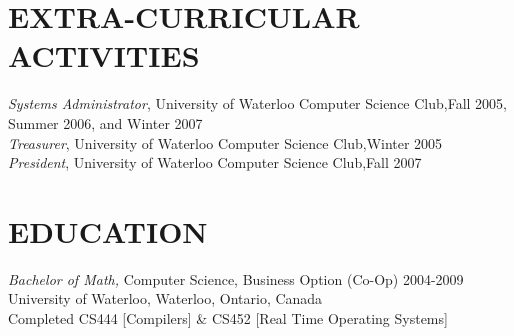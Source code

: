 \documentclass[10pt,line,margin=0.1]{newsres}
\begin{document}
\begin{resume}
 
\section{EXTRA-CURRICULAR \\ ACTIVITIES}             
        {\it Systems Administrator}, University of Waterloo Computer Science Club,\hfill  Fall 2005, Summer 2006, and Winter 2007 \\
        {\it Treasurer}, University of Waterloo Computer Science Club,\hfill Winter 2005 \\
        {\it President}, University of Waterloo Computer Science Club,\hfill Fall 2007 \\

\section{EDUCATION} {\sl Bachelor of Math,} Computer Science, Business Option (Co-Op) 2004-2009 \\
                University of Waterloo, Waterloo, Ontario, Canada \\
                Completed CS444 [Compilers] \& CS452 [Real Time Operating Systems]


\end{resume}
\end{document}
